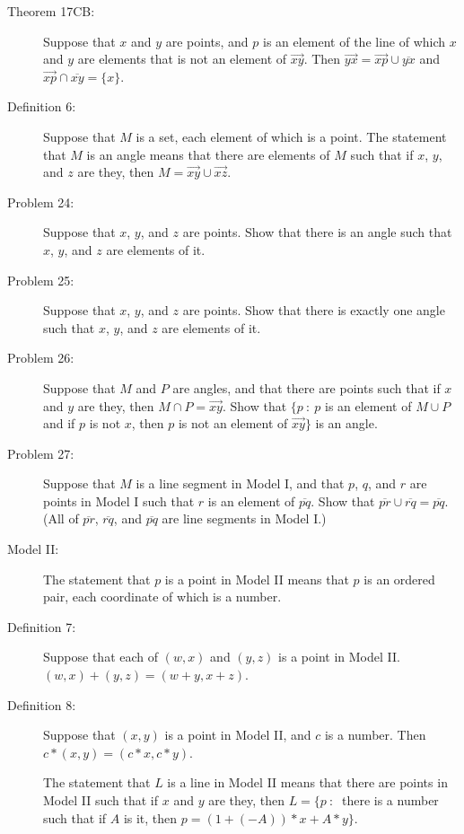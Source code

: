 \documentclass{article}
\begin{document}
\begin{description}
  \item[Theorem 17CB:] Suppose that $x$ and $y$ are points, and $p$ is an element of the line of which $x$ and $y$ are elements that is not an element of $\overrightarrow{xy}$. Then $\overrightarrow{yx} = \overrightarrow{xp} \cup \overline{yx}$ and $\overrightarrow{xp} \cap \overline{xy} = \{ x \}$.

  \item[Definition 6:] Suppose that $M$ is a set, each element of which is a point. The statement that $M$ is an angle means that there are elements of $M$ such that if $x$, $y$, and $z$ are they, then $M = \overrightarrow{xy} \cup \overrightarrow{xz}$.

  \item[Problem 24:] Suppose that $x$, $y$, and $z$ are points. Show that there is an angle such that $x$, $y$, and $z$ are elements of it.

  \item[Problem 25:] Suppose that $x$, $y$, and $z$ are points. Show that there is exactly one angle such that $x$, $y$, and $z$ are elements of it.

  \item[Problem 26:] Suppose that $M$ and $P$ are angles, and that there are points such that if $x$ and $y$ are they, then $M \cap P = \overrightarrow{xy}$. Show that $\{ p\ :\ p$ is an element of $M \cup P$ and if $p$ is not $x$, then $p$ is not an element of $\overrightarrow{xy} \}$ is an angle.

  \item[Problem 27:] Suppose that $M$ is a line segment in Model I, and that $p$, $q$, and $r$ are points in Model I such that $r$ is an element of $\overline{pq}$. Show that $\overline{pr} \cup \overline{rq} = \overline{pq}$. (All of $\overline{pr}$, $\overline{rq}$, and $\overline{pq}$ are line segments in Model I.)

  \item[Model II:] The statement that $p$ is a point in Model II means that $p$ is an ordered pair, each coordinate of which is a number.

  \item[Definition 7:] Suppose that each of $(w, x)$ and $(y, z)$ is a point in Model II. $(w, x) + (y, z) = (w+y, x+z)$.

  \item[Definition 8:] Suppose that $(x,y)$ is a point in Model II, and $c$ is a number. Then $c*(x,y) = (c*x,c*y)$.

     The statement that $L$ is a line in Model II means that there are points in Model II such that if $x$ and $y$ are they, then $L = \{ p\ :\ $ there is a number such that if $A$ is it, then $p=(1+(-A))*x+A*y \}$.


\end{description}
\end{document}
